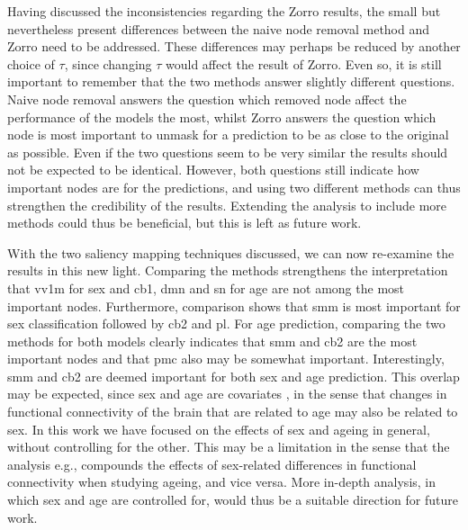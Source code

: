 Having discussed the inconsistencies regarding the Zorro results, the small but nevertheless present differences between the naive node removal method and Zorro need to be addressed. These differences may perhaps be reduced by another choice of $\tau$, since changing $\tau$ would affect the result of Zorro. Even so, it is still important to remember that the two methods answer slightly different questions. Naive node removal answers the question which removed node affect the performance of the models the most, whilst Zorro answers the question which node is most important to unmask for a prediction to be as close to the original as possible. Even if the two questions seem to be very similar the results should not be expected to be identical. However, both questions still indicate how important nodes are for the predictions, and using two different methods can thus strengthen the credibility of the results. Extending the analysis to include more methods could thus be beneficial, but this is left as future work.


With the two saliency mapping techniques discussed, we can now re-examine the results in this new light. Comparing the methods  strengthens the interpretation that \acrshort{vv1m} for sex and \acrshort{cb1}, \acrshort{dmn} and \acrshort{sn} for age are not among the most important nodes. Furthermore, comparison shows that \acrshort{smm} is most important for sex classification followed by \acrshort{cb2} and \acrshort{pl}. For age prediction, comparing the two methods for both models clearly indicates that \acrshort{smm} and \acrshort{cb2} are the most important nodes and that \acrshort{pmc} also may be somewhat important. Interestingly, \acrshort{smm} and \acrshort{cb2} are deemed important for both sex and age prediction. This overlap may be expected, since sex and age are covariates \cite{zhang_covariates}, in the sense that changes in functional connectivity of the brain that are related to age may also be related to sex. In this work we have focused on the effects of sex and ageing in general, without controlling for the other. This may be a limitation in the sense that the analysis e.g., compounds the effects of sex-related differences in functional connectivity when studying ageing, and vice versa. More in-depth analysis, in which sex and age are controlled for, would thus be a suitable direction for future work.

